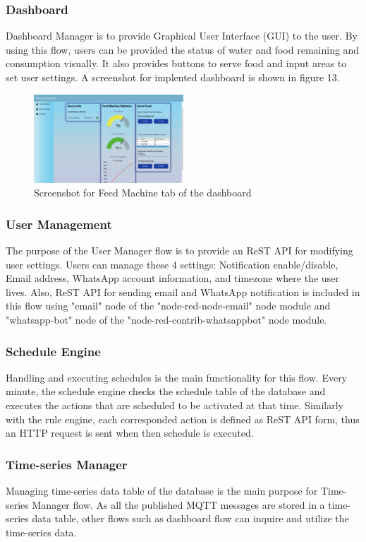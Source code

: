 \documentclass[conference]{IEEEtran}
\begin{document}
\subsubsection{Dashboard}
Dashboard Manager is to provide Graphical User Interface (GUI) to the user. By using this flow, users can be provided the status of water and food remaining and consumption visually. It also provides buttons to serve food and input areas to set user settings. A screenshot for implented dashboard is shown in figure 13.

\begin{figure}[htbp]
\centerline{\includegraphics[width=0.5\textwidth]{./images/feed_machine_ui.png}}
\caption{Screenshot for Feed Machine tab of the dashboard}
\label{fig}
\end{figure}

\subsubsection{User Management}
The purpose of the User Manager flow is to provide an ReST API for modifying user settings.
Users can manage these 4 settings: Notification enable/disable, Email address, WhatsApp account information, and timezone where the user lives.
Also, ReST API for sending email and WhatsApp notification is included in this flow using "email" node of the "node-red-node-email" node module and "whatsapp-bot" node of the "node-red-contrib-whatsappbot" node module.

\subsubsection{Schedule Engine}
Handling and executing schedules is the main functionality for this flow.
Every minute, the schedule engine checks the schedule table of the database and executes the actions that are scheduled to be activated at that time.
Similarly with the rule engine, each corresponded action is defined as ReST API form, thus an HTTP request is sent when then schedule is executed.

\subsubsection{Time-series Manager}
Managing time-series data table of the database is the main purpose for Time-series Manager flow. As all the published MQTT messages are stored in a time-series data table, other flows such as dashboard flow can inquire and utilize the time-series data.
\end{document}

